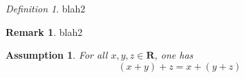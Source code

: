 \documentclass[11 pt, a4paper, oneside, openany, notitlepage]{article}
\theoremstyle{plain}
\newtheorem{assumption}{Assumption}
\theoremstyle{definition}
\newtheorem{remark}{Remark}
\theoremstyle{remark}
\newtheorem{definition}{Definition}
\begin{document}
\begin{definition}
  blah2
\end{definition}

\begin{remark}
  blah2
\end{remark}

\begin{assumption}
  For all $ x, y, z \in \mathbf R$, one has
  \[ (x + y) + z= x +( y + z) \]
\end{assumption}
\end{document}
